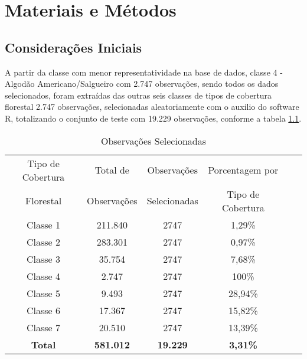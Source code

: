 \chapter{Materiais e Métodos}

\section{Considerações Iniciais}
A partir da classe com menor representatividade na base de dados, classe 4 - Algodão Americano/Salgueiro com 2.747 observações, sendo todos os dados selecionados, foram extraídas das outras seis classes de tipos de cobertura florestal 2.747 observações, selecionadas aleatoriamente com o auxilio do software R, totalizando o conjunto de teste com 19.229 observações, conforme a tabela \ref{tb:dados}.

\begin{table}[htbp]
\caption{Observações Selecionadas}
\label{tb:dados}
\centering
\setlength{\tabcolsep}{5pt}
\begin{tabular}{cccccc}
\hline
Tipo de Cobertura  &Total de  &Observações  &Porcentagem por \\
Florestal &Observações &Selecionadas &Tipo de Cobertura \\
\hline
Classe 1 &211.840 &2747 &1,29\% \\
Classe 2 &283.301 &2747 &0,97\% \\
Classe 3 &35.754  &2747 &7,68\% \\
Classe 4 &2.747   &2747 &100\% \\
Classe 5 &9.493   &2747 &28,94\% \\
Classe 6 &17.367  &2747 &15,82\% \\
Classe 7 &20.510  &2747 &13,39\% \\
\hline
\textbf{Total} &\textbf{581.012} &\textbf{19.229} &\textbf{3,31\%} \\
\hline
\end{tabular}
\\
\end{table}
